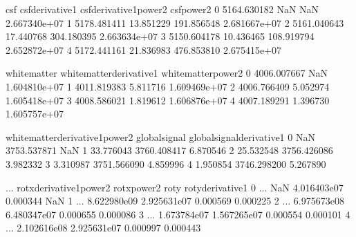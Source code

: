 \documentclass[letterpaper,10pt,english]{sphinxmanual}
\begin{document}
\begin{sphinxVerbatim}[commandchars=\\\{\}]
  \PYG{p}{[}\PYG{p}{]}

  \PYG{p}{[}\PYG{p}{]} 
\end{sphinxVerbatim}

\begin{sphinxVerbatim}[commandchars=\\\{\}]
           csf  csf\PYGZus{}derivative1  csf\PYGZus{}derivative1\PYGZus{}power2    csf\PYGZus{}power2  \PYGZbs{}
0  5164.630182              NaN                     NaN  2.667340e+07   
1  5178.481411        13.851229              191.856548  2.681667e+07   
2  5161.040643       \PYGZhy{}17.440768              304.180395  2.663634e+07   
3  5150.604178       \PYGZhy{}10.436465              108.919794  2.652872e+07   
4  5172.441161        21.836983              476.853810  2.675415e+07   

   white\PYGZus{}matter  white\PYGZus{}matter\PYGZus{}derivative1  white\PYGZus{}matter\PYGZus{}power2  \PYGZbs{}
0   4006.007667                       NaN         1.604810e+07   
1   4011.819383                  5.811716         1.609469e+07   
2   4006.766409                 \PYGZhy{}5.052974         1.605418e+07   
3   4008.586021                  1.819612         1.606876e+07   
4   4007.189291                 \PYGZhy{}1.396730         1.605757e+07   

   white\PYGZus{}matter\PYGZus{}derivative1\PYGZus{}power2  global\PYGZus{}signal  global\PYGZus{}signal\PYGZus{}derivative1  \PYGZbs{}
0                              NaN    3753.537871                        NaN   
1                        33.776043    3760.408417                   6.870546   
2                        25.532548    3756.426086                  \PYGZhy{}3.982332   
3                         3.310987    3751.566090                  \PYGZhy{}4.859996   
4                         1.950854    3746.298200                  \PYGZhy{}5.267890   

   ...  rot\PYGZus{}x\PYGZus{}derivative1\PYGZus{}power2  rot\PYGZus{}x\PYGZus{}power2     rot\PYGZus{}y  rot\PYGZus{}y\PYGZus{}derivative1  \PYGZbs{}
0  ...                       NaN  4.016403e\PYGZhy{}07  0.000344                NaN   
1  ...              8.622980e\PYGZhy{}09  2.925631e\PYGZhy{}07  0.000569           0.000225   
2  ...              6.975673e\PYGZhy{}08  6.480347e\PYGZhy{}07  0.000655           0.000086   
3  ...              1.673784e\PYGZhy{}07  1.567265e\PYGZhy{}07  0.000554          \PYGZhy{}0.000101   
4  ...              2.102616e\PYGZhy{}08  2.925631e\PYGZhy{}07  0.000997           0.000443   


\end{sphinxVerbatim}
\end{document}
